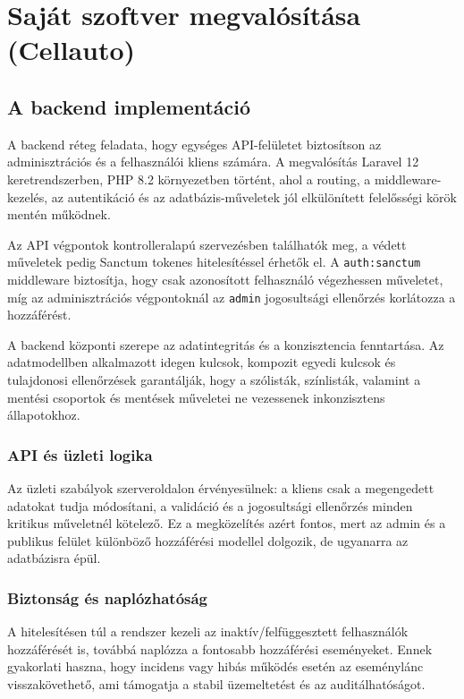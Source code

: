 \documentclass{thesis-ekf}
\begin{document}
\chapter{Saját szoftver megvalósítása (Cellauto)}

\section{A backend implementáció}

A backend réteg feladata, hogy egységes API-felületet biztosítson az adminisztrációs és a felhasználói kliens számára. A megvalósítás Laravel 12 keretrendszerben, PHP 8.2 környezetben történt, ahol a routing, a middleware-kezelés, az autentikáció és az adatbázis-műveletek jól elkülönített felelősségi körök mentén működnek.

Az API végpontok kontrolleralapú szervezésben találhatók meg, a védett műveletek pedig Sanctum tokenes hitelesítéssel érhetők el. A \texttt{auth:sanctum} middleware biztosítja, hogy csak azonosított felhasználó végezhessen műveletet, míg az adminisztrációs végpontoknál az \texttt{admin} jogosultsági ellenőrzés korlátozza a hozzáférést.

A backend központi szerepe az adatintegritás és a konzisztencia fenntartása. Az adatmodellben alkalmazott idegen kulcsok, kompozit egyedi kulcsok és tulajdonosi ellenőrzések garantálják, hogy a szólisták, színlisták, valamint a mentési csoportok és mentések műveletei ne vezessenek inkonzisztens állapotokhoz.

\subsection{API és üzleti logika}
Az üzleti szabályok szerveroldalon érvényesülnek: a kliens csak a megengedett adatokat tudja módosítani, a validáció és a jogosultsági ellenőrzés minden kritikus műveletnél kötelező. Ez a megközelítés azért fontos, mert az admin és a publikus felület különböző hozzáférési modellel dolgozik, de ugyanarra az adatbázisra épül.

\subsection{Biztonság és naplózhatóság}
A hitelesítésen túl a rendszer kezeli az inaktív/felfüggesztett felhasználók hozzáférését is, továbbá naplózza a fontosabb hozzáférési eseményeket. Ennek gyakorlati haszna, hogy incidens vagy hibás működés esetén az eseménylánc visszakövethető, ami támogatja a stabil üzemeltetést és az auditálhatóságot.
\end{document}
